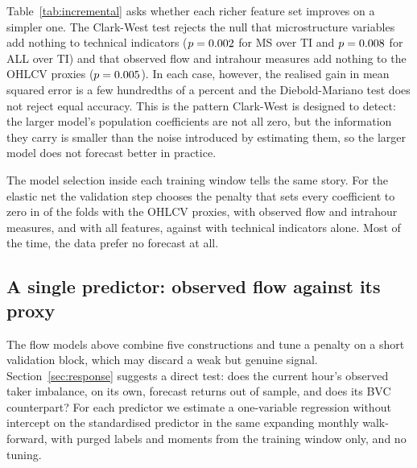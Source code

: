 \begin{table}[t]
\centering\caption{Incremental predictive information, BTC/USDT}\label{tab:incremental}
\resizebox{\textwidth}{!}{}
\end{table}

Table~\ref{tab:incremental} asks whether each richer feature set improves on a simpler one. The
Clark-West test rejects the null that microstructure variables add nothing to technical indicators
($p=0.002$ for MS over TI and $p=0.008$ for ALL over TI) and that observed flow and
intrahour measures add nothing to the OHLCV proxies ($p=0.005$). In each case, however,
the realised gain in mean squared error is a few hundredths of a percent and the Diebold-Mariano test
does not reject equal accuracy. This is the pattern Clark-West is designed to detect: the larger
model's population coefficients are not all zero, but the information they carry is smaller than the
noise introduced by estimating them, so the larger model does not forecast better in practice.

The model selection inside each training window tells the same story. For the elastic net the
validation step chooses the penalty that sets every coefficient to zero in \BTCnullMSproxy{} of the
\BTCnFolds{} folds with the OHLCV proxies, \BTCnullMS{} with observed flow and intrahour measures, and
\BTCnullALL{} with all features, against \BTCnullTI{} with technical indicators alone. Most of the
time, the data prefer no forecast at all.

\subsection{A single predictor: observed flow against its proxy}

The flow models above combine five constructions and tune a penalty on a short validation block,
which may discard a weak but genuine signal. Section~\ref{sec:response} suggests a direct test: does
the current hour's observed taker imbalance, on its own, forecast returns out of sample, and does its
BVC counterpart? For each predictor we estimate a one-variable regression without intercept on the
standardised predictor in the same expanding monthly walk-forward, with purged labels and moments
from the training window only, and no tuning.

